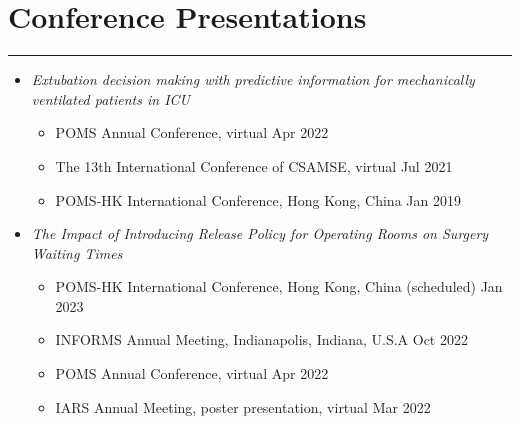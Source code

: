\documentclass[12pt, a4paper]{article}
\begin{document}
{\begin{enumerate}[leftmargin=28pt, itemsep=6pt, parsep=0.2pt, topsep=1pt]
\end{enumerate}




\section*{Conference Presentations}
\vspace*{0.4em}
\hrule height 0.5pt
\begin{itemize}[leftmargin=26pt, itemsep=8pt, parsep=0.2pt, topsep=1pt]

	\item {\it Extubation decision making with predictive information for mechanically ventilated patients in ICU}
	\begin{itemize}[leftmargin=14pt, itemsep=4pt, topsep=2pt]
		\item POMS Annual Conference, virtual \hfill Apr 2022
		\item The 13th International Conference of CSAMSE, virtual \hfill Jul 2021
		\item POMS-HK International Conference, Hong Kong, China \hfill Jan 2019
	\end{itemize}

	\item {\it The Impact of Introducing Release Policy for Operating Rooms on Surgery Waiting Times}
	\begin{itemize}[leftmargin=14pt, itemsep=2pt, topsep=2pt]
		\item POMS-HK International Conference, Hong Kong, China (scheduled) \hfill Jan 2023
		\item INFORMS Annual Meeting, Indianapolis, Indiana, U.S.A \hfill Oct 2022
		\item POMS Annual Conference, virtual \hfill Apr 2022
		\item IARS Annual Meeting, poster presentation, virtual \hfill Mar 2022
	\end{itemize}

\end{itemize}




}
\end{document}
